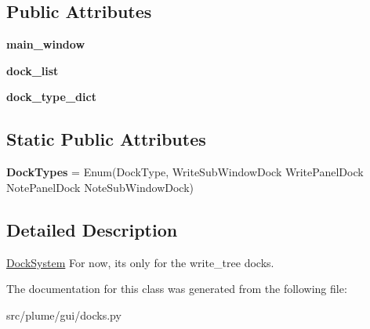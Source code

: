 \subsection*{Public Attributes}
\begin{DoxyCompactItemize}
\item 
{\bfseries main\+\_\+window}\hypertarget{classplume-creator_1_1src_1_1plume_1_1gui_1_1docks_1_1_dock_system_ab398ebbb5e0d8bd6570aa9b47fd0e8e9}{}\label{classplume-creator_1_1src_1_1plume_1_1gui_1_1docks_1_1_dock_system_ab398ebbb5e0d8bd6570aa9b47fd0e8e9}

\item 
{\bfseries dock\+\_\+list}\hypertarget{classplume-creator_1_1src_1_1plume_1_1gui_1_1docks_1_1_dock_system_a7bfdc6687efa296141045d718adfc586}{}\label{classplume-creator_1_1src_1_1plume_1_1gui_1_1docks_1_1_dock_system_a7bfdc6687efa296141045d718adfc586}

\item 
{\bfseries dock\+\_\+type\+\_\+dict}\hypertarget{classplume-creator_1_1src_1_1plume_1_1gui_1_1docks_1_1_dock_system_a97ba93e6a0cb6f6ed5da3808cfd564c9}{}\label{classplume-creator_1_1src_1_1plume_1_1gui_1_1docks_1_1_dock_system_a97ba93e6a0cb6f6ed5da3808cfd564c9}

\end{DoxyCompactItemize}
\subsection*{Static Public Attributes}
\begin{DoxyCompactItemize}
\item 
{\bfseries Dock\+Types} = Enum(\textquotesingle{}Dock\+Type\textquotesingle{}, \textquotesingle{}Write\+Sub\+Window\+Dock Write\+Panel\+Dock Note\+Panel\+Dock Note\+Sub\+Window\+Dock\textquotesingle{})\hypertarget{classplume-creator_1_1src_1_1plume_1_1gui_1_1docks_1_1_dock_system_ab037d673ff6b8eb46206af36c11f846e}{}\label{classplume-creator_1_1src_1_1plume_1_1gui_1_1docks_1_1_dock_system_ab037d673ff6b8eb46206af36c11f846e}

\end{DoxyCompactItemize}


\subsection{Detailed Description}
\hyperlink{classplume-creator_1_1src_1_1plume_1_1gui_1_1docks_1_1_dock_system}{Dock\+System} For now, it\textquotesingle{}s only for the write\+\_\+tree docks. 

The documentation for this class was generated from the following file\+:\begin{DoxyCompactItemize}
\item 
src/plume/gui/docks.\+py\end{DoxyCompactItemize}

